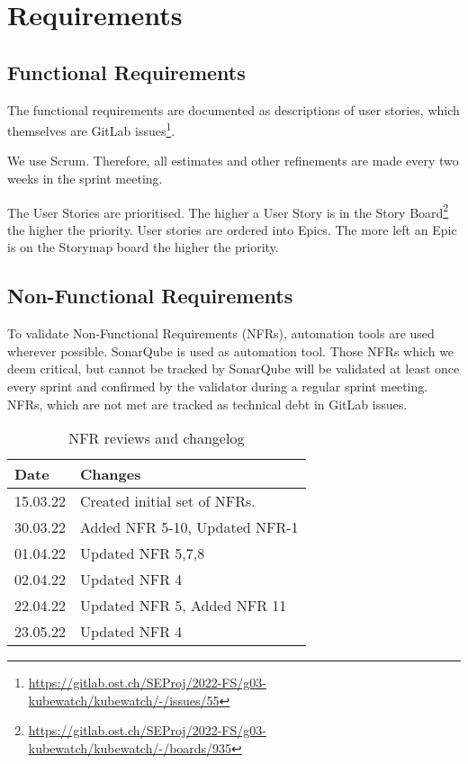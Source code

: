 \chapter{Requirements}

\section{Functional Requirements}
\label{section:functional-requirements}
The functional requirements are documented as descriptions of user stories, which themselves are GitLab issues\footnote{\url{https://gitlab.ost.ch/SEProj/2022-FS/g03-kubewatch/kubewatch/-/issues/55}}.

We use Scrum.
Therefore, all estimates and other refinements are made every two weeks in the sprint meeting.

The User Stories are prioritised.
The higher a User Story is in the Story Board\footnote{\url{https://gitlab.ost.ch/SEProj/2022-FS/g03-kubewatch/kubewatch/-/boards/935}} the higher the priority.
User stories are ordered into Epics. The more left an Epic is on the Storymap board the higher the priority.

\section{Non-Functional Requirements}
\label{section:non-functional-requirements}
To validate Non-Functional Requirements (NFRs), automation tools are used wherever possible. SonarQube is used as automation tool. Those NFRs which we deem critical, but cannot be tracked by SonarQube will be validated at least once every sprint and confirmed by the validator during a regular sprint meeting. NFRs, which are not met are tracked as technical debt in GitLab issues.

\begin{table}[h!]
    \centering
      \caption{\label{tab:nfr-review}NFR reviews and changelog}
      \begin{tabular}{ | l | l | }
        \hline
        \textbf{Date} & \textbf{Changes} \\
        \hline
        15.03.22 & Created initial set of NFRs. \\
        \hline
        30.03.22 & Added NFR 5-10, Updated NFR-1 \\
        \hline
        01.04.22 & Updated NFR 5,7,8 \\
        \hline
        02.04.22 & Updated NFR 4 \\
        \hline
        22.04.22 & Updated NFR 5, Added NFR 11 \\
        \hline
        23.05.22 & Updated NFR 4 \\
        \hline
      \end{tabular}
    \end{table}

